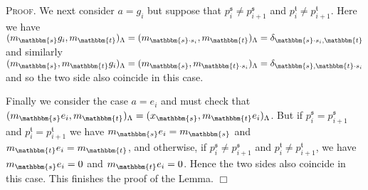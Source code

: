 \documentclass[10pt,a4,twoside,hidelinks,rm]{article}
\newcommand\es{\mathbbm{s}}
\newcommand\et{\mathbbm{t}}
\newcommand{\bT}{\pmb{\mathfrak{t}}}
\newcommand{\Bs}{\pmb{\mathfrak{s}}}
\theoremstyle{plain}
\newenvironment{demo}
{\textsc{Proof.}} {\quad \hfill $\Box$}
\begin{document}
\begin{demo}
We next consider $ a = g_i $ but 
suppose that 
$ p_i^{\Bs} \neq  p_{i+1}^{\Bs} $ and $ p_i^{\bT} \neq p_{i+1}^{\bT} $.
Here we have $ (m_{\es} g_i , m_{\et} )_{\Lambda} =  (m_{\es \cdot s_i } , m_{\et} )_{\Lambda} =
\delta_{\es \cdot s_i , \et} $ and similarly 
$ (m_{\es}  , m_{\et}g_i )_{\Lambda} =  (m_{\es } , m_{\et  \cdot s_i}   )_{\Lambda} =
\delta_{\es  , \et \cdot s_i} $ and so the two side also coincide in this case.



\medskip
Finally we consider the case $ a  =e_i $ and must check that
$ (m_{\es } e_i , m_{\et  })_{\Lambda} = (x_{\es } , m_{\et  } e_i )_{\Lambda}  $.
But if $ p_i^{\Bs} = p_{i+1}^{\Bs} $ and $ p_i^{\bT} = p_{i+1}^{\bT} $
we have $ m_{\es } e_i = m_{\es } $ and $ m_{\et } e_i = m_{\et } $, and
otherwise, if $ p_i^{\Bs} \neq  p_{i+1}^{\Bs} $ and $ p_i^{\bT} \neq p_{i+1}^{\bT} $, 
we have $ m_{\es } e_i = 0 $ and $ m_{\et } e_i = 0 $. 
Hence the two sides also coincide in this case. This finishes the proof of the Lemma. 
\end{demo}
\end{document}
